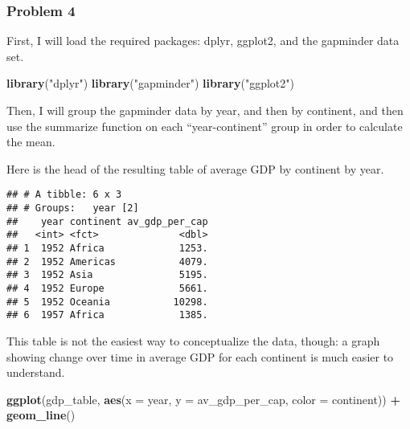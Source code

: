 \documentclass[]{article}
\newenvironment{Shaded}{\begin{snugshade}}{\end{snugshade}}
\newcommand{\DataTypeTok}[1]{\textcolor[rgb]{0.13,0.29,0.53}{#1}}
\newcommand{\KeywordTok}[1]{\textcolor[rgb]{0.13,0.29,0.53}{\textbf{#1}}}
\newcommand{\NormalTok}[1]{#1}
\newcommand{\OperatorTok}[1]{\textcolor[rgb]{0.81,0.36,0.00}{\textbf{#1}}}
\newcommand{\StringTok}[1]{\textcolor[rgb]{0.31,0.60,0.02}{#1}}
\begin{document}
\hypertarget{problem-4}{%
\subsubsection{Problem 4}\label{problem-4}}

First, I will load the required packages: dplyr, ggplot2, and the
gapminder data set.

\begin{Shaded}
\begin{Highlighting}[]
\KeywordTok{library}\NormalTok{(}\StringTok{"dplyr"}\NormalTok{)}
\KeywordTok{library}\NormalTok{(}\StringTok{"gapminder"}\NormalTok{)}
\KeywordTok{library}\NormalTok{(}\StringTok{"ggplot2"}\NormalTok{)}
\end{Highlighting}
\end{Shaded}

Then, I will group the gapminder data by year, and then by continent,
and then use the summarize function on each ``year-continent'' group in
order to calculate the mean.

\begin{Shaded}
\end{Shaded}

Here is the head of the resulting table of average GDP by continent by
year.

\begin{verbatim}
## # A tibble: 6 x 3
## # Groups:   year [2]
##    year continent av_gdp_per_cap
##   <int> <fct>              <dbl>
## 1  1952 Africa             1253.
## 2  1952 Americas           4079.
## 3  1952 Asia               5195.
## 4  1952 Europe             5661.
## 5  1952 Oceania           10298.
## 6  1957 Africa             1385.
\end{verbatim}

This table is not the easiest way to conceptualize the data, though: a
graph showing change over time in average GDP for each continent is much
easier to understand.

\begin{Shaded}
\begin{Highlighting}[]
\KeywordTok{ggplot}\NormalTok{(gdp_table, }\KeywordTok{aes}\NormalTok{(}\DataTypeTok{x =}\NormalTok{ year, }\DataTypeTok{y =}\NormalTok{ av_gdp_per_cap, }\DataTypeTok{color =}\NormalTok{ continent)) }\OperatorTok{+}\StringTok{ }\KeywordTok{geom_line}\NormalTok{()}
\end{Highlighting}
\end{Shaded}
\end{document}
